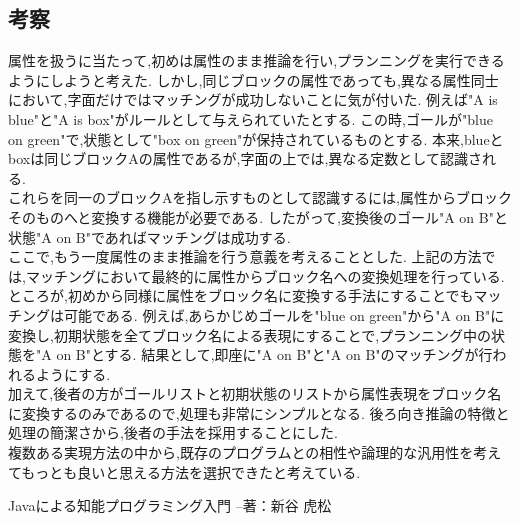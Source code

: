 \documentclass[uplatex,12pt]{jsarticle}
\begin{document}

\subsection{考察}
属性を扱うに当たって,初めは属性のまま推論を行い,プランニングを実行できるようにしようと考えた.
しかし,同じブロックの属性であっても,異なる属性同士において,字面だけではマッチングが成功しないことに気が付いた.
例えば"A is blue"と"A is box"がルールとして与えられていたとする.
この時,ゴールが"blue on green"で,状態として"box on green"が保持されているものとする.
本来,blueとboxは同じブロックAの属性であるが,字面の上では,異なる定数として認識される. \\
これらを同一のブロックAを指し示すものとして認識するには,属性からブロックそのものへと変換する機能が必要である.
したがって,変換後のゴール"A on B"と状態"A on B"であればマッチングは成功する. \\
ここで,もう一度属性のまま推論を行う意義を考えることとした.
上記の方法では,マッチングにおいて最終的に属性からブロック名への変換処理を行っている.
ところが,初めから同様に属性をブロック名に変換する手法にすることでもマッチングは可能である.
例えば,あらかじめゴールを"blue on green"から"A on B"に変換し,初期状態を全てブロック名による表現にすることで,プランニング中の状態を"A on B"とする.
結果として,即座に"A on B"と"A on B"のマッチングが行われるようにする. \\
加えて,後者の方がゴールリストと初期状態のリストから属性表現をブロック名に変換するのみであるので,処理も非常にシンプルとなる.
後ろ向き推論の特徴と処理の簡潔さから,後者の手法を採用することにした. \\
複数ある実現方法の中から,既存のプログラムとの相性や論理的な汎用性を考えてもっとも良いと思える方法を選択できたと考えている.


\begin{thebibliography}{99}
 Javaによる知能プログラミング入門 --著：新谷 虎松 \\
\end{thebibliography}
\end{document}
